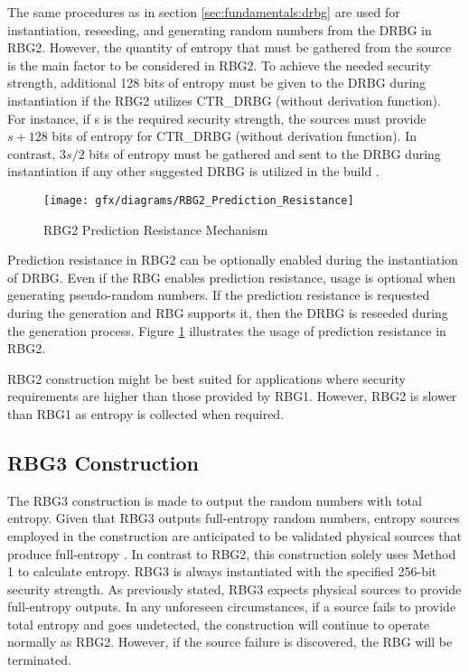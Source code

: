 The same procedures as in section \ref{sec:fundamentals:drbg} are used for instantiation, reseeding, and generating random numbers from the DRBG in RBG2. However, the quantity of entropy that must be gathered from the source is the main factor to be considered in RBG2. To achieve the needed security strength, additional 128 bits of entropy must be given to the DRBG during instantiation if the RBG2 utilizes CTR\_DRBG (without derivation function). For instance, if s is the required security strength, the sources must provide $s+128$ bits of entropy for CTR\_DRBG (without derivation function). In contrast, $3s/2$ bits of entropy must be gathered and sent to the DRBG during instantiation if any other suggested DRBG is utilized in the build \cite{SP90C-2022}.

\begin{figure}[htbp]
	\centering
	\texttt{[image: gfx/diagrams/RBG2\_Prediction\_Resistance]}
	\caption{RBG2 Prediction Resistance Mechanism}
	\label{fig:3:4}
\end{figure}

Prediction resistance in RBG2 can be optionally enabled during the instantiation of DRBG. Even if the RBG enables prediction resistance, usage is optional when generating pseudo-random numbers. If the prediction resistance is requested during the generation and RBG supports it, then the DRBG is reseeded during the generation process. Figure \ref{fig:3:4} illustrates the usage of prediction resistance in RBG2.

RBG2 construction might be best suited for applications where security requirements are higher than those provided by RBG1. However, RBG2 is slower than RBG1 as entropy is collected when required.

%
%
\subsection{RBG3 Construction}
\label{subsec:SoA:RBG3}
The RBG3 construction is made to output the random numbers with total entropy. Given that RBG3 outputs full-entropy random numbers, entropy sources employed in the construction are anticipated to be validated physical sources that produce full-entropy \cite{SP90C-2022}. In contrast to RBG2, this construction solely uses Method 1 to calculate entropy. RBG3 is always instantiated with the specified 256-bit security strength. As previously stated, RBG3 expects physical sources to provide full-entropy outputs. In any unforeseen circumstances, if a source fails to provide total entropy and goes undetected, the construction will continue to operate normally as RBG2. However, if the source failure is discovered, the RBG will be terminated.

